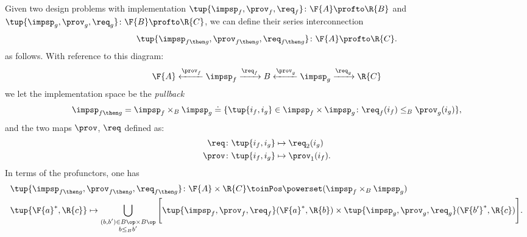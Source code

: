 \begin{definition}
  \label{def:seriesdpi}
  Given two design problems with implementation $\tup{\impsp_f,\prov_f,\req_f}\colon \F{A}\profto \R{B}$
  and $\tup{\impsp_g,\prov_g,\req_g}\colon \F{B}\profto \R{C}$, we can define their
  series interconnection
  \begin{equation*}
    \tup{\impsp_{f\then g},\prov_{f\then g},\req_{f\then g}}\colon \F{A}\profto \R{C}.
  \end{equation*}
  as follows. With reference to this diagram:
  \begin{equation}
    \F{A} \xleftarrow{\prov_f} \impsp_f \xrightarrow{\req_f} B
    \xleftarrow{\prov_g} \impsp_g \xrightarrow{\req_g} \R{C}
  \end{equation}
  we let the implementation space be the \emph{pullback}
  \begin{equation}
    \begin{aligned}
      \impsp_{f\then g}&= \impsp_f \times_B \impsp_g \doteq \{
      \tup{i_f,i_g} \in \impsp_f \times \impsp_g \colon
      \req_f(i_f) \leq_{B} \prov_g(i_g)
      \},\\
    \end{aligned}
  \end{equation}
  and the two maps $\prov$, $\req$ defined as:
  \begin{equation}
    \begin{aligned}
      \req  &\colon \tup{i_f,i_g} \mapsto \req_2(i_g)\\
      \prov  &\colon  \tup{i_f,i_g} \mapsto \prov_1(i_f).
    \end{aligned}
  \end{equation}
  In terms of the profunctors, one has
  \begin{equation}
    \label{eq:seriesdpi}
    \begin{aligned}
      &\tup{\impsp_{f\then g},\prov_{f\then g},\req_{f\then g}}\colon \F{A}\times \R{C} \toinPos \powerset(\impsp_f \times_B \impsp_g) \\
      &\tup{\F{a}^*,\R{c}} \mapsto \bigcup_{\substack{(b,b') \in B\op \times B\op \\ b \leq_B b'}} \Bigg[ \tup{\impsp_f,\prov_f,\req_f}(\F{a}^*,\R{b}) \times \tup{\impsp_g,\prov_g,\req_g}(\F{b'}^*,\R{c}) \Bigg].
    \end{aligned}
  \end{equation}
\end{definition}

